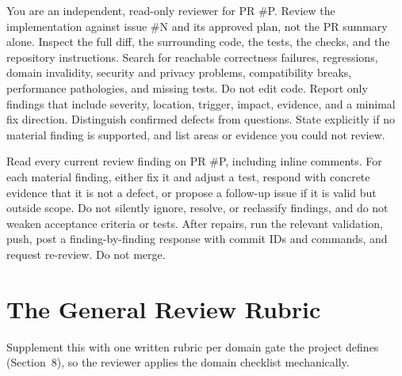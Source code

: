 \documentclass[11pt]{article}
\begin{document}
\begin{keyidea}
You are an independent, read-only reviewer for PR \#P. Review the implementation against issue
\#N and its approved plan, not the PR summary alone. Inspect the full diff, the surrounding
code, the tests, the checks, and the repository instructions. Search for reachable correctness
failures, regressions, domain invalidity, security and privacy problems, compatibility breaks,
performance pathologies, and missing tests. Do not edit code. Report only findings that include
severity, location, trigger, impact, evidence, and a minimal fix direction. Distinguish
confirmed defects from questions. State explicitly if no material finding is supported, and list
areas or evidence you could not review.
\end{keyidea}

\begin{keyidea}
Read every current review finding on PR \#P, including inline comments. For each material
finding, either fix it and adjust a test, respond with concrete evidence that it is not a
defect, or propose a follow-up issue if it is valid but outside scope. Do not silently ignore,
resolve, or reclassify findings, and do not weaken acceptance criteria or tests. After repairs,
run the relevant validation, push, post a finding-by-finding response with commit IDs and
commands, and request re-review. Do not merge.
\end{keyidea}

\section{The General Review Rubric}
\label{app:rubric}

Supplement this with one written rubric per domain gate the project defines
(Section~8), so the reviewer applies the domain checklist mechanically.
\end{document}
